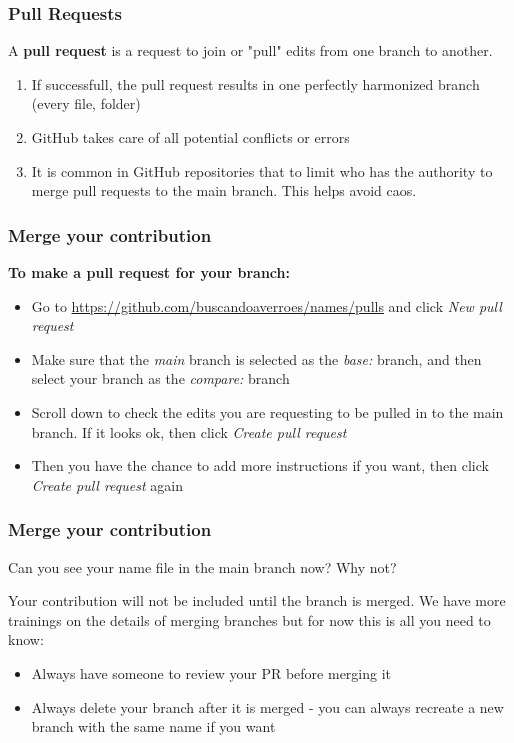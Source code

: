 \documentclass[aspectratio=169]{beamer} %
\newcommand{\trainingURL}[1]{{\color{blue}\url{#1}}}
\newcommand{\traininerUsername}{buscandoaverroes}
\newcommand{\repoName}{\traininerUsername/names}
\newcommand{\trainingRepoURL}[1]{\trainingURL{https://github.com/\repoName #1}}
\begin{document}
\begin{frame}
\frametitle{Pull Requests}

 	A \textbf{pull request} is a request to join or "pull"
	edits from one branch to another.
	\vspace{0.5cm}

	\begin{enumerate}
		\item If successfull, the pull request results in one perfectly harmonized branch (every file, folder)
		\item GitHub takes care of all potential conflicts or errors
		\item It is common in GitHub repositories that to limit who has the authority to merge pull requests to the main branch. This helps avoid caos.
	\end{enumerate}





\end{frame}

\begin{frame}
\frametitle{Merge your contribution}

	\textbf{To make a pull request for your branch:}
	\begin{itemize}
		\item Go to \trainingRepoURL{/pulls} and click \textit{New pull request}
		\item Make sure that the \textit{main} branch is selected as the \textit{base:} branch, and then select your branch as the \textit{compare:} branch
		\item Scroll down to check the edits you are requesting to be pulled in to the main branch. If it looks ok, then click \textit{Create pull request}
		\item Then you have the chance to add more instructions if you want, then click \textit{Create pull request} again
	\end{itemize}
\end{frame}

\begin{frame}
\frametitle{Merge your contribution}

Can you see your name file in the main branch now? Why not?

\vspace{.5cm}

Your contribution will not be included until the branch is merged. We have more trainings on the details of merging branches but for now this is all you need to know:

	\begin{itemize}
		\item Always have someone to review your PR before merging it
		\item Always delete your branch after it is merged - you can always recreate a new branch with the same name if you want
	\end{itemize}

\end{frame}
\end{document}
